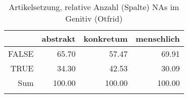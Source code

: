 \begin{table}[ht]
\centering
\begin{tabular}{rrrr}
  \lsptoprule
 & abstrakt & konkretum & menschlich \\ 
  \midrule
FALSE & 65.70 & 57.47 & 69.91 \\ 
  TRUE & 34.30 & 42.53 & 30.09 \\ 
  Sum & 100.00 & 100.00 & 100.00 \\ 
   \lspbottomrule
\end{tabular}
\caption{Artikelsetzung, relative Anzahl (Spalte) NAs im Genitiv (Otfrid)} 
\end{table}
